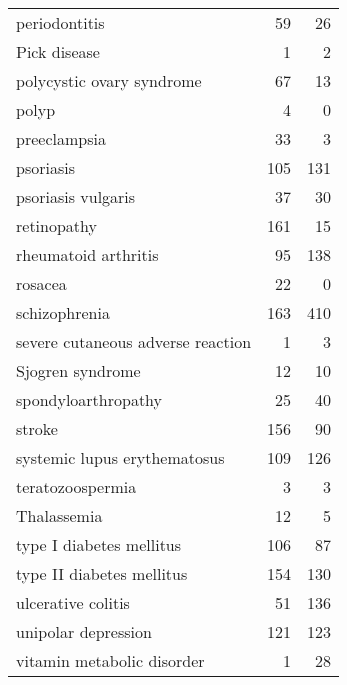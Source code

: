 \begin{table}[ht]
\begin{tabular}{lrr}
  periodontitis & 59 & 26 \\ 
  Pick disease & 1 & 2 \\ 
  polycystic ovary syndrome & 67 & 13 \\ 
  polyp & 4 & 0 \\ 
  preeclampsia & 33 & 3 \\ 
  psoriasis & 105 & 131 \\ 
  psoriasis vulgaris & 37 & 30 \\ 
  retinopathy & 161 & 15 \\ 
  rheumatoid arthritis & 95 & 138 \\ 
  rosacea & 22 & 0 \\ 
  schizophrenia & 163 & 410 \\ 
  severe cutaneous adverse reaction & 1 & 3 \\ 
  Sjogren syndrome & 12 & 10 \\ 
  spondyloarthropathy & 25 & 40 \\ 
  stroke & 156 & 90 \\ 
  systemic lupus erythematosus & 109 & 126 \\ 
  teratozoospermia & 3 & 3 \\ 
  Thalassemia & 12 & 5 \\ 
  type I diabetes mellitus & 106 & 87 \\ 
  type II diabetes mellitus & 154 & 130 \\ 
  ulcerative colitis & 51 & 136 \\ 
  unipolar depression & 121 & 123 \\ 
  vitamin metabolic disorder & 1 & 28 \\ 
   \hline
\end{tabular}
\end{table}
